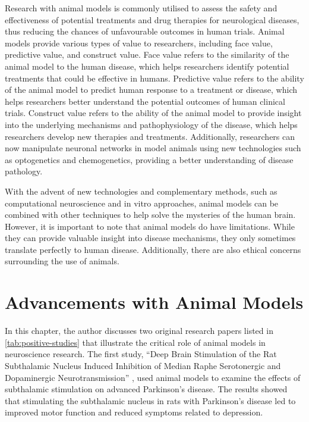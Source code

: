 \documentclass[10pt]{article}
\begin{document}
\begin{sloppypar}
  Research with animal models is commonly utilised to assess the safety and effectiveness of potential treatments and drug therapies for neurological diseases, thus reducing the chances of unfavourable outcomes in human trials. Animal models provide various types of value to researchers, including face value, predictive value, and construct value. Face value refers to the similarity of the animal model to the human disease, which helps researchers identify potential treatments that could be effective in humans. Predictive value refers to the ability of the animal model to predict human response to a treatment or disease, which helps researchers better understand the potential outcomes of human clinical trials. Construct value refers to the ability of the animal model to provide insight into the underlying mechanisms and pathophysiology of the disease, which helps researchers develop new therapies and treatments. Additionally, researchers can now manipulate neuronal networks in model animals using new technologies such as optogenetics and chemogenetics, providing a better understanding of disease pathology.

  With the advent of new technologies and complementary methods, such as computational neuroscience and in vitro approaches, animal models can be combined with other techniques to help solve the mysteries of the human brain. However, it is important to note that animal models do have limitations. While they can provide valuable insight into disease mechanisms, they only sometimes translate perfectly to human disease. Additionally, there are also ethical concerns surrounding the use of animals.

  \section{Advancements with Animal Models}
  \label{sec:advancements}

  In this chapter, the author discusses two original research papers listed in \autoref{tab:positive-studies} that illustrate the critical role of animal models in neuroscience research. The first study, “Deep Brain Stimulation of the Rat Subthalamic Nucleus Induced Inhibition of Median Raphe Serotonergic and Dopaminergic Neurotransmission” \citep{kocabicak_deep_2014}, used animal models to examine the effects of subthalamic stimulation on advanced Parkinson’s disease. The results showed that stimulating the subthalamic nucleus in rats with Parkinson’s disease led to improved motor function and reduced symptoms related to depression.


\end{sloppypar}
\end{document}
